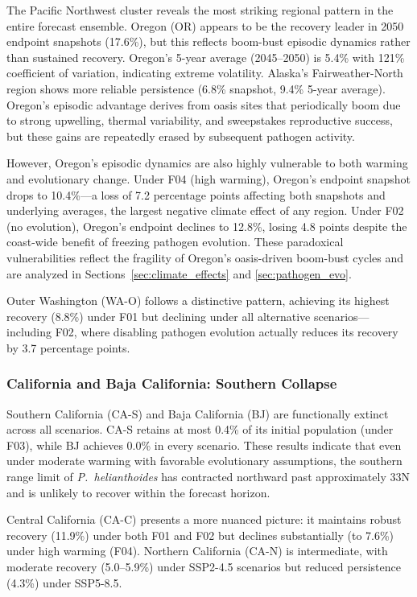 The Pacific Northwest cluster reveals the most striking regional
pattern in the entire forecast ensemble.  Oregon (OR) appears to be 
the recovery leader in 2050 endpoint snapshots (17.6\%), but this 
reflects boom-bust episodic dynamics rather than sustained recovery. 
Oregon's 5-year average (2045--2050) is 5.4\% with 121\% coefficient 
of variation, indicating extreme volatility. Alaska's Fairweather-North 
region shows more reliable persistence (6.8\% snapshot, 9.4\% 5-year 
average). Oregon's episodic advantage derives from oasis sites that 
periodically boom due to strong upwelling, thermal variability, and 
sweepstakes reproductive success, but these gains are repeatedly erased 
by subsequent pathogen activity.

However, Oregon's episodic dynamics are also highly vulnerable to both 
warming and evolutionary change.  Under F04 (high warming), Oregon's 
endpoint snapshot drops to 10.4\%---a loss of 7.2 percentage points 
affecting both snapshots and underlying averages, the largest negative
climate effect of any region.  Under F02 (no evolution), Oregon's 
endpoint declines to 12.8\%, losing 4.8 points despite the coast-wide 
benefit of freezing pathogen evolution.  These paradoxical vulnerabilities 
reflect the fragility of Oregon's oasis-driven boom-bust cycles and are
analyzed in Sections~\ref{sec:climate_effects} and \ref{sec:pathogen_evo}.

Outer Washington (WA-O) follows a distinctive pattern, achieving its
highest recovery (8.8\%) under F01 but declining under all alternative
scenarios---including F02, where disabling pathogen evolution actually
reduces its recovery by 3.7 percentage points.

\subsubsection{California and Baja California: Southern Collapse}

Southern California (CA-S) and Baja California (BJ) are functionally
extinct across all scenarios.  CA-S retains at most 0.4\% of its
initial population (under F03), while BJ achieves 0.0\% in every
scenario.  These results indicate that even under moderate warming with
favorable evolutionary assumptions, the southern range limit of
\textit{P.~helianthoides} has contracted northward past approximately
33\textdegree N and is unlikely to recover within the forecast horizon.

Central California (CA-C) presents a more nuanced picture: it maintains
robust recovery (11.9\%) under both F01 and F02 but declines
substantially (to 7.6\%) under high warming (F04).  Northern California
(CA-N) is intermediate, with moderate recovery (5.0--5.9\%) under
SSP2-4.5 scenarios but reduced persistence (4.3\%) under SSP5-8.5.

